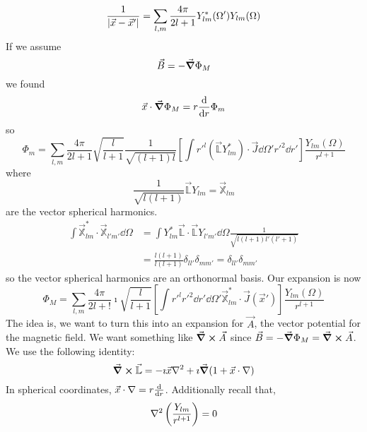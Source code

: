 \documentclass[a4paper,twoside,master.tex]{subfiles}
\begin{document}
\begin{equation}
    \frac{1}{\abs{ \vec{x} - \vec{x}'}} = \sum_{l,m} \frac{4 \pi}{2l+1} Y_{lm}^*(\Omega') Y_{lm}(\Omega)
\end{equation}
If we assume
\begin{equation}
    \vec{B} = - \grad{\Phi_{M}}
\end{equation}
we found
\begin{equation}
    \vec{x} \cdot \grad{\Phi_M} = r \dv{r} \Phi_m
\end{equation}
so
\begin{equation}
    \Phi_{m} = \sum_{l,m} \frac{4\pi}{2l+1} \sqrt{\frac{l}{l+1}} \frac{1}{\sqrt{(l+1)l}} \left[ \int r'^l(\vec{\mathbb{L}}Y_{lm}^*) \cdot \vec{J} \dd{\Omega'} r'^2 \dd{r'} \right] \frac{Y_{lm}(\Omega)}{r^{l+1}}
\end{equation}
where
\begin{equation}
    \frac{1}{\sqrt{l(l+1)}} \vec{\mathbb{L}} Y_{lm} = \vec{\mathbb{X}}_{lm}
\end{equation}
are the vector spherical harmonics.
\begin{align}
    \int \vec{\mathbb{X}}_{lm}^* \cdot \vec{\mathbb{X}}_{l'm'} \dd{\Omega} &= \int Y_{lm}^* \vec{\mathbb{L}} \cdot \vec{\mathbb{L}} Y_{l'm'} \dd{\Omega} \frac{1}{\sqrt{l(l+1)l'(l'+1)}}\\
    &= \frac{l(l+1)}{l(l+1)} \delta_{ll'} \delta_{mm'} = \delta_{ll'} \delta_{mm'}
\end{align}
so the vector spherical harmonics are an orthonormal basis. Our expansion is now
\begin{equation}
    \Phi_{M} = \sum_{l,m} \frac{4 \pi}{2l+!}\imath \sqrt{\frac{l}{l+1}} \left[ \int r'^l r'^2 \dd{r'} \dd{\Omega'} \vec{\mathbb{X}}^*_{lm} \cdot \vec{J}( \vec{x}') \right] \frac{Y_{lm}(\Omega)}{r^{l+1}}
\end{equation}
The idea is, we want to turn this into an expansion for $ \vec{A} $, the vector potential for the magnetic field. We want something like $ \curl{ \vec{A}} $ since $ \vec{B} = - \grad{\Phi_M} = \curl{ \vec{A}} $. We use the following identity:
\begin{equation}
    \curl{ \vec{\mathbb{L}}} = -\imath \vec{x} \nabla^2 + \imath \grad{(1+ \vec{x} \cdot \nabla)}
\end{equation}
In spherical coordinates, $ \vec{x} \cdot \nabla = r \dv{r} $. Additionally recall that,
\begin{equation}
    \laplacian{\left( \frac{Y_{lm}}{r^{l+1}} \right)} = 0
\end{equation}
\end{document}
